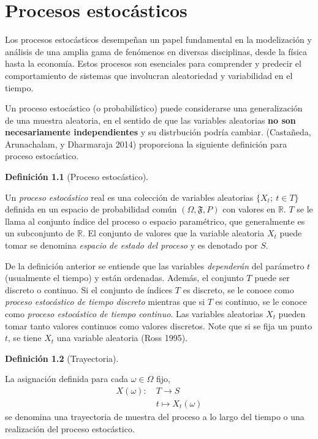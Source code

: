 \documentclass[
  us-letterpaper,
]{scrreprt}
\theoremstyle{plain}
\theoremstyle{definition}
\newtheorem{definition}{Definición}[chapter]
\theoremstyle{definition}
\theoremstyle{plain}
\theoremstyle{remark}
\begin{document}
\chapter{Procesos estocásticos}\label{procesos-estocuxe1sticos}

Los procesos estocásticos desempeñan un papel fundamental en la
modelización y análisis de una amplia gama de fenómenos en diversas
disciplinas, desde la física hasta la economía. Estos procesos son
esenciales para comprender y predecir el comportamiento de sistemas que
involucran aleatoriedad y variabilidad en el tiempo.

Un proceso estocástico (o probabilístico) puede considerarse una
generalización de una muestra aleatoria, en el sentido de que las
variables aleatorias \textbf{no son necesariamente independientes} y su
distrbución podría cambiar. (Castañeda, Arunachalam, y Dharmaraja 2014)
proporciona la siguiente definición para proceso estocástico.

\begin{definition}[Proceso
estocástico]\protect\hypertarget{def-PE}{}\label{def-PE}

Un \emph{proceso estocástico} real es una colección de variables
aleatorias \(\{X_t;\  t\in T\}\) definida en un espacio de probabilidad
común \((\Omega, \mathfrak{F}, P)\) con valores en \(\mathbb{R}\). \(T\)
se le llama al conjunto índice del proceso o espacio paramétrico, que
generalmente es un subconjunto de \(\mathbb R\). El conjunto de valores
que la variable aleatoria \(X_t\) puede tomar se denomina \emph{espacio
de estado del proceso} y es denotado por \(S\).

\end{definition}

De la definición anterior se entiende que las variables
\emph{dependerán} del parámetro \(t\) (usualmente el tiempo) y están
ordenadas. Además, el conjunto \(T\) puede ser discreto o continuo. Si
el conjunto de índices \(T\) es discreto, se le conoce como
\emph{proceso estocástico de tiempo discreto} mientras que si \(T\) es
continuo, se le conoce como \emph{proceso estocástico de tiempo
continuo}. Las variables aleatorias \(X_t\) pueden tomar tanto valores
continuos como valores discretos. Note que si se fija un punto \(t\), se
tiene \(X_t\) una variable aleatoria (Ross 1995).

\begin{definition}[Trayectoria]\protect\hypertarget{def-realiza}{}\label{def-realiza}

La asignación definida para cada \(\omega\in\Omega\) fijo,
\[\begin{split}X(\omega):\ &T\to S\\ &t\mapsto X_t(\omega)\end{split}\]
se denomina una trayectoria de muestra del proceso a lo largo del tiempo
o una realización del proceso estocástico.

\end{definition}
\end{document}
